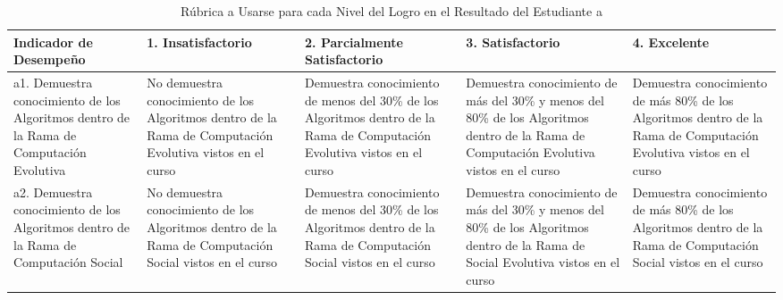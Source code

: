 \begin{landscape}
\begin{table}[h]
\centering
\begin{tabular}{C{5cm}|C{4cm}|C{4cm}|C{4cm}|C{4cm}}
\hline
\textbf{Indicador de Desempeño} & 
\textbf{1. Insatisfactorio} & 
\textbf{2. Parcialmente Satisfactorio} & 
\textbf{3. Satisfactorio} & 
\textbf{4. Excelente} 
\\ \hline
a1. Demuestra conocimiento de los Algoritmos dentro de la Rama de Computación Evolutiva &
No demuestra conocimiento de los Algoritmos dentro de la Rama de Computación Evolutiva vistos en el curso &
Demuestra conocimiento de menos del 30\% de los Algoritmos dentro de la Rama de Computación Evolutiva vistos en el curso &
Demuestra conocimiento de más del 30\% y menos del 80\% de los Algoritmos dentro de la Rama de Computación Evolutiva vistos en el curso &
Demuestra conocimiento de más 80\% de los Algoritmos dentro de la Rama de Computación Evolutiva vistos en el curso
\\ \hline
a2. Demuestra conocimiento de los Algoritmos dentro de la Rama de Computación Social &
No demuestra conocimiento de los Algoritmos dentro de la Rama de Computación Social vistos en el curso &
Demuestra conocimiento de menos del 30\% de los Algoritmos dentro de la Rama de Computación Social vistos en el curso &
Demuestra conocimiento de más del 30\% y menos del 80\% de los Algoritmos dentro de la Rama de Social Evolutiva vistos en el curso &
Demuestra conocimiento de más 80\% de los Algoritmos dentro de la Rama de Computación Social vistos en el curso
\\ \hline
\end{tabular}
\caption{Rúbrica a Usarse para cada Nivel del Logro en el Resultado del Estudiante \lbrack a\rbrack}
\label{tab:nivel_rubrica_a} 
\end{table}

\newpage


\end{landscape}
